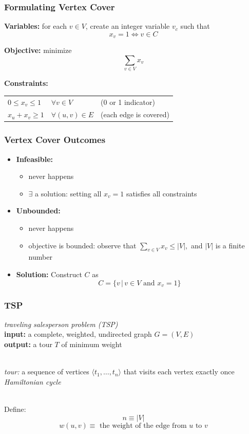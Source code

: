 \documentclass{beamer}
\newcommand{\stanza}{ \\~\ }
\begin{document}
\begin{frame} \frametitle{Formulating Vertex Cover}
\textbf{Variables:} for each $v \in V$, create an integer variable $v_c$ such that
\[ x_v = 1 \Leftrightarrow v \in C \]

\textbf{Objective:} minimize
\[ \sum_{v \in V} x_v \]

\textbf{Constraints:}
\begin{tabular}{lll}
  $0 \leq x_v \leq 1$ & $\forall v \in V$ & (0 or 1 indicator) \\
  $x_u + x_v \geq 1$ & $\forall (u, v) \in E$ & (each edge is covered)
\end{tabular}

\end{frame}

\begin{frame} \frametitle{Vertex Cover Outcomes}
  \begin{itemize}
    \item \textbf{Infeasible:}
      \begin{itemize}
      \item never happens
      \item $\exists$ a solution: setting all $x_v=1$ satisfies all constraints
      \end{itemize}
    \item \textbf{Unbounded:}
    \begin{itemize}
      \item never happens
      \item objective is bounded: observe that $\sum_{v \in V} x_v \leq |V|,$ and $|V|$ is a finite number
    \end{itemize}
    \item \textbf{Solution:} Construct $C$ as
      \[ C = \{ v \,|\, v \in V \text{ and } x_v=1 \} \]
    \end{itemize}
  \end{frame}

  \begin{frame} \frametitle{TSP}
    \emph{traveling salesperson problem (TSP)} \\
    \textbf{input:} a complete, weighted, undirected graph $G=(V, E)$ \\
    \textbf{output:} a tour $T$ of minimum weight
    \stanza

    \emph{tour:} a sequence of vertices $\langle t_1, \ldots, t_n \rangle$
    that visits each vertex exactly once \emph{Hamiltonian cycle}
    \stanza
  
    Define: \\
    \[ n \equiv |V| \]
    \[ w(u, v) \equiv \text{ the weight of the edge from } u \text{ to } v \]
  \end{frame}
  
\end{document}

